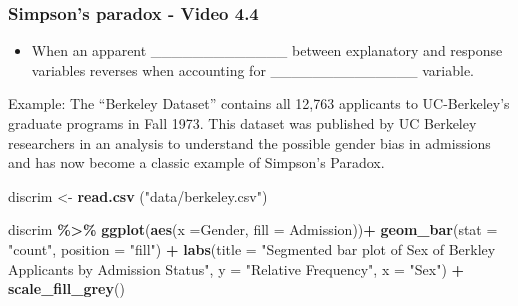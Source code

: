 \documentclass[
]{report}
\newenvironment{Shaded}{\begin{snugshade}}{\end{snugshade}}
\newcommand{\AttributeTok}[1]{\textcolor[rgb]{0.13,0.29,0.53}{#1}}
\newcommand{\FunctionTok}[1]{\textcolor[rgb]{0.13,0.29,0.53}{\textbf{#1}}}
\newcommand{\NormalTok}[1]{#1}
\newcommand{\OtherTok}[1]{\textcolor[rgb]{0.56,0.35,0.01}{#1}}
\newcommand{\SpecialCharTok}[1]{\textcolor[rgb]{0.81,0.36,0.00}{\textbf{#1}}}
\newcommand{\StringTok}[1]{\textcolor[rgb]{0.31,0.60,0.02}{#1}}
\providecommand{\tightlist}{%
  \setlength{\itemsep}{0pt}\setlength{\parskip}{0pt}}
\begin{document}
\vspace{0.2in}

\newpage

\subsubsection*{Simpson's paradox - Video 4.4}\label{simpsons-paradox---video-4.4}


\begin{itemize}
\tightlist
\item
  When an apparent \_\_\_\_\_\_\_\_\_\_\_\_\_ between explanatory and response variables reverses when accounting for \_\_\_\_\_\_\_\_\_\_\_\_\_\_ variable.
\end{itemize}


Example: The ``Berkeley Dataset'' contains all 12,763 applicants to UC-Berkeley's graduate programs in Fall 1973. This dataset was published by UC Berkeley researchers in an analysis to understand the possible gender bias in admissions and has now become a classic example of Simpson's Paradox.

\begin{Shaded}
\begin{Highlighting}[]
\NormalTok{discrim }\OtherTok{\textless{}{-}} \FunctionTok{read.csv}\NormalTok{ (}\StringTok{"data/berkeley.csv"}\NormalTok{)}

\NormalTok{discrim }\SpecialCharTok{\%\textgreater{}\%}
  \FunctionTok{ggplot}\NormalTok{(}\FunctionTok{aes}\NormalTok{(}\AttributeTok{x =}\NormalTok{Gender, }\AttributeTok{fill =}\NormalTok{ Admission))}\SpecialCharTok{+}
  \FunctionTok{geom\_bar}\NormalTok{(}\AttributeTok{stat =} \StringTok{"count"}\NormalTok{, }\AttributeTok{position =} \StringTok{"fill"}\NormalTok{) }\SpecialCharTok{+}
  \FunctionTok{labs}\NormalTok{(}\AttributeTok{title =} \StringTok{"Segmented bar plot of Sex of Berkley Applicants by}
\StringTok{       Admission Status"}\NormalTok{,}
       \AttributeTok{y =} \StringTok{"Relative Frequency"}\NormalTok{,}
       \AttributeTok{x =} \StringTok{"Sex"}\NormalTok{) }\SpecialCharTok{+}
  \FunctionTok{scale\_fill\_grey}\NormalTok{()}
\end{Highlighting}
\end{Shaded}
\end{document}
